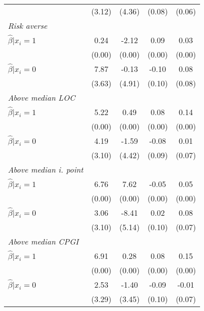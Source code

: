 \begin{table}[h]
{\begin{threeparttable}
\begin{tabular}{l*{4}{c}}
                &   (3.12)&   (4.36)&   (0.08)&   (0.06)\\
\textit{Risk averse}&         &         &         &         \\
\hspace{0.5cm} \(\hat\beta|x_i=1\)&     0.24&    -2.12&     0.09&     0.03\\
                &   (0.00)&   (0.00)&   (0.00)&   (0.00)\\
\hspace{0.5cm} \(\hat\beta|x_i=0\)&7.87\sym{**}&    -0.13&    -0.10&     0.08\\
                &   (3.63)&   (4.91)&   (0.10)&   (0.08)\\
\textit{Above median LOC}&         &         &         &         \\
\hspace{0.5cm} \(\hat\beta|x_i=1\)&     5.22&     0.49&     0.08&     0.14\\
                &   (0.00)&   (0.00)&   (0.00)&   (0.00)\\
\hspace{0.5cm} \(\hat\beta|x_i=0\)&     4.19&    -1.59&    -0.08&     0.01\\
                &   (3.10)&   (4.42)&   (0.09)&   (0.07)\\
\textit{Above median i. point}&         &         &         &         \\
\hspace{0.5cm} \(\hat\beta|x_i=1\)&     6.76&     7.62&    -0.05&     0.05\\
                &   (0.00)&   (0.00)&   (0.00)&   (0.00)\\
\hspace{0.5cm} \(\hat\beta|x_i=0\)&     3.06&    -8.41&     0.02&     0.08\\
                &   (3.10)&   (5.14)&   (0.10)&   (0.07)\\
\textit{Above median CPGI}&         &         &         &         \\
\hspace{0.5cm} \(\hat\beta|x_i=1\)&6.91\sym{*}&     0.28&     0.08&0.15\sym{*}\\
                &   (0.00)&   (0.00)&   (0.00)&   (0.00)\\
\hspace{0.5cm} \(\hat\beta|x_i=0\)&     2.53&    -1.40&    -0.09&    -0.01\\
                &   (3.29)&   (3.45)&   (0.10)&   (0.07)\\

\end{tabular}
\end{threeparttable}}
\end{table}
